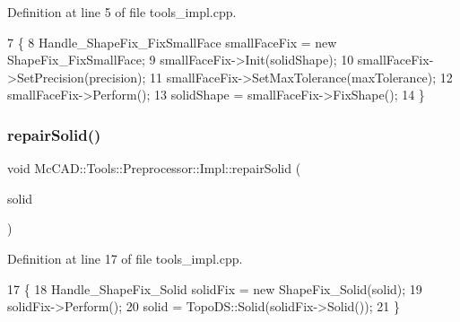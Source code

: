 Definition at line 5 of file tools\+\_\+impl.\+cpp.


\begin{DoxyCode}
7                                                                               \{
8     Handle\_ShapeFix\_FixSmallFace smallFaceFix = \textcolor{keyword}{new} ShapeFix\_FixSmallFace;
9     smallFaceFix->Init(solidShape);
10     smallFaceFix->SetPrecision(precision);
11     smallFaceFix->SetMaxTolerance(maxTolerance);
12     smallFaceFix->Perform();
13     solidShape = smallFaceFix->FixShape();
14 \}
\end{DoxyCode}
\mbox{\label{classMcCAD_1_1Tools_1_1Preprocessor_1_1Impl_a388f2f564e20bdc6b0a238d1a2dc89ab}} 
\subsubsection{\texorpdfstring{repair\+Solid()}{repairSolid()}\hspace{0.1cm}{\footnotesize\ttfamily [1/2]}}
{\footnotesize\ttfamily void Mc\+C\+A\+D\+::\+Tools\+::\+Preprocessor\+::\+Impl\+::repair\+Solid (\begin{DoxyParamCaption}\item[{Topo\+D\+S\+\_\+\+Solid \&}]{solid }\end{DoxyParamCaption})}



Definition at line 17 of file tools\+\_\+impl.\+cpp.


\begin{DoxyCode}
17                                                           \{
18     Handle\_ShapeFix\_Solid solidFix = \textcolor{keyword}{new} ShapeFix\_Solid(solid);
19     solidFix->Perform();
20     solid = TopoDS::Solid(solidFix->Solid());
21 \}
\end{DoxyCode}
\mbox{\label{classMcCAD_1_1Tools_1_1Preprocessor_1_1Impl_a388f2f564e20bdc6b0a238d1a2dc89ab}} 
